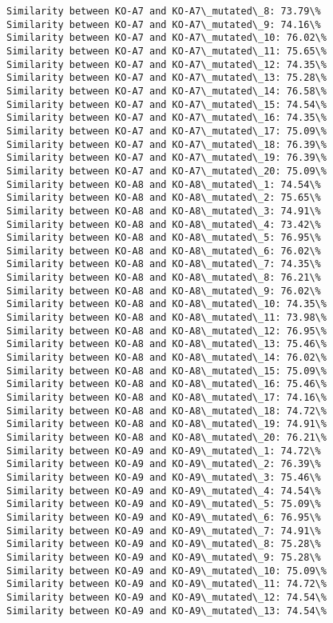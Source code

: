 \documentclass[11pt]{article}
\begin{document}
\begin{Verbatim}[commandchars=\\\{\}]
Similarity between KO-A7 and KO-A7\_mutated\_8: 73.79\%
Similarity between KO-A7 and KO-A7\_mutated\_9: 74.16\%
Similarity between KO-A7 and KO-A7\_mutated\_10: 76.02\%
Similarity between KO-A7 and KO-A7\_mutated\_11: 75.65\%
Similarity between KO-A7 and KO-A7\_mutated\_12: 74.35\%
Similarity between KO-A7 and KO-A7\_mutated\_13: 75.28\%
Similarity between KO-A7 and KO-A7\_mutated\_14: 76.58\%
Similarity between KO-A7 and KO-A7\_mutated\_15: 74.54\%
Similarity between KO-A7 and KO-A7\_mutated\_16: 74.35\%
Similarity between KO-A7 and KO-A7\_mutated\_17: 75.09\%
Similarity between KO-A7 and KO-A7\_mutated\_18: 76.39\%
Similarity between KO-A7 and KO-A7\_mutated\_19: 76.39\%
Similarity between KO-A7 and KO-A7\_mutated\_20: 75.09\%
Similarity between KO-A8 and KO-A8\_mutated\_1: 74.54\%
Similarity between KO-A8 and KO-A8\_mutated\_2: 75.65\%
Similarity between KO-A8 and KO-A8\_mutated\_3: 74.91\%
Similarity between KO-A8 and KO-A8\_mutated\_4: 73.42\%
Similarity between KO-A8 and KO-A8\_mutated\_5: 76.95\%
Similarity between KO-A8 and KO-A8\_mutated\_6: 76.02\%
Similarity between KO-A8 and KO-A8\_mutated\_7: 74.35\%
Similarity between KO-A8 and KO-A8\_mutated\_8: 76.21\%
Similarity between KO-A8 and KO-A8\_mutated\_9: 76.02\%
Similarity between KO-A8 and KO-A8\_mutated\_10: 74.35\%
Similarity between KO-A8 and KO-A8\_mutated\_11: 73.98\%
Similarity between KO-A8 and KO-A8\_mutated\_12: 76.95\%
Similarity between KO-A8 and KO-A8\_mutated\_13: 75.46\%
Similarity between KO-A8 and KO-A8\_mutated\_14: 76.02\%
Similarity between KO-A8 and KO-A8\_mutated\_15: 75.09\%
Similarity between KO-A8 and KO-A8\_mutated\_16: 75.46\%
Similarity between KO-A8 and KO-A8\_mutated\_17: 74.16\%
Similarity between KO-A8 and KO-A8\_mutated\_18: 74.72\%
Similarity between KO-A8 and KO-A8\_mutated\_19: 74.91\%
Similarity between KO-A8 and KO-A8\_mutated\_20: 76.21\%
Similarity between KO-A9 and KO-A9\_mutated\_1: 74.72\%
Similarity between KO-A9 and KO-A9\_mutated\_2: 76.39\%
Similarity between KO-A9 and KO-A9\_mutated\_3: 75.46\%
Similarity between KO-A9 and KO-A9\_mutated\_4: 74.54\%
Similarity between KO-A9 and KO-A9\_mutated\_5: 75.09\%
Similarity between KO-A9 and KO-A9\_mutated\_6: 76.95\%
Similarity between KO-A9 and KO-A9\_mutated\_7: 74.91\%
Similarity between KO-A9 and KO-A9\_mutated\_8: 75.28\%
Similarity between KO-A9 and KO-A9\_mutated\_9: 75.28\%
Similarity between KO-A9 and KO-A9\_mutated\_10: 75.09\%
Similarity between KO-A9 and KO-A9\_mutated\_11: 74.72\%
Similarity between KO-A9 and KO-A9\_mutated\_12: 74.54\%
Similarity between KO-A9 and KO-A9\_mutated\_13: 74.54\%

\end{Verbatim}
\end{document}
